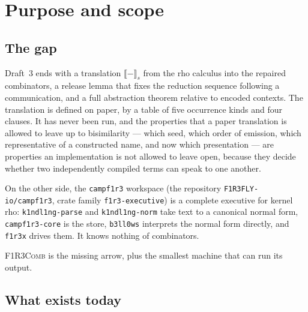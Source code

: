 \documentclass[11pt,a4paper]{article}
\newcommand{\code}[1]{\texttt{#1}}
\newcommand{\Comb}{\textsc{F1R3Comb}}
\newcommand{\enc}[1]{\llbracket #1 \rrbracket}
\theoremstyle{definition}
\theoremstyle{plain}
\begin{document}
\tableofcontents

\section{Purpose and scope}\label{sec:purpose}

\subsection{The gap}

Draft~3 ends with a translation $\enc{-}_{s}$ from the rho calculus into the
repaired combinators, a release lemma that fixes the reduction sequence
following a communication, and a full abstraction theorem relative to encoded
contexts. The translation is defined on paper, by a table of five occurrence
kinds and four clauses. It has never been run, and the properties that a
paper translation is allowed to leave up to bisimilarity --- which seed, which
order of emission, which representative of a constructed name, and now which
presentation --- are properties an implementation is not allowed to leave
open, because they decide whether two independently compiled terms can speak
to one another.

On the other side, the \code{campf1r3} workspace (the repository
\code{F1R3FLY-io/campf1r3}, crate family \code{f1r3-executive}) is a complete
executive for kernel rho: \code{k1ndl1ng-parse} and \code{k1ndl1ng-norm} take
text to a canonical normal form, \code{campf1r3-core} is the store,
\code{b3ll0ws} interprets the normal form directly, and \code{f1r3x} drives
them. It knows nothing of combinators.

\Comb{} is the missing arrow, plus the smallest machine that can run its
output.

\subsection{What exists today}
\end{document}
